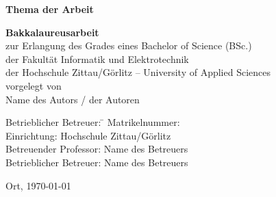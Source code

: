  \begin{titlepage}

      \enlargethispage{3cm}
      \begin{center}
          {\LARGE \textbf{Thema der Arbeit}}
          \vspace{3cm}
          \begin{flushleft}
              {\large \textbf{Bakkalaureusarbeit}}\\[1cm]
              zur Erlangung des Grades eines Bachelor of Science (BSc.)\\
              der Fakult\"{a}t Informatik und Elektrotechnik \\
              der Hochschule Zittau/G\"{o}rlitz -- University of Applied Sciences\\[3cm]

          vorgelegt von \\[1cm]
          {\large Name des Autors / der Autoren} \\
	

          {    \begin{tabbing}

	    
                Betrieblicher Betreuer: \= \kill
		 Matrikelnummer:  \\
				Einrichtung: \> Hochschule Zittau/Görlitz \\
                Betreuender Professor: \> Name des Betreuers\\
                Betrieblicher Betreuer: \> Name des Betreuers\\
            \end{tabbing}}
          \vfill
              Ort, \today
          \end{flushleft}


      \end{center}
      \setcounter{page}{0}
  \end{titlepage}